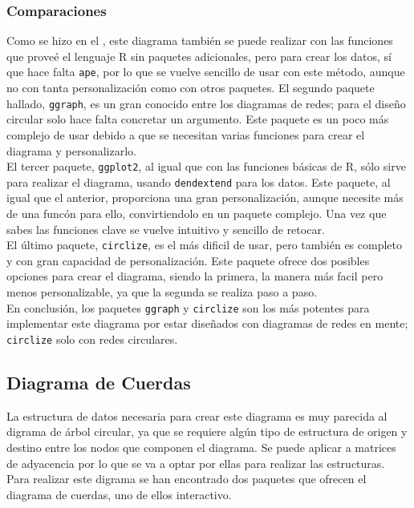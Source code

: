 \documentclass{article}\usepackage[]{graphicx}\usepackage[]{color}
\begin{document}
\subsubsection{Comparaciones}
Como se hizo en el , 
este diagrama tambi\'en se puede realizar con las funciones que prove\'e el lenguaje R sin paquetes adicionales, pero para crear los datos, s\'i que hace falta \texttt{ape}, por lo que se vuelve sencillo de usar con este m\'etodo, aunque no con tanta personalizaci\'on como con otros paquetes. El segundo paquete hallado, \texttt{ggraph}, es un gran conocido entre los diagramas de redes; para el dise\~no circular solo hace falta concretar un argumento. Este paquete es un poco m\'as complejo de usar debido a que se necesitan varias funciones para crear el diagrama y personalizarlo.~\\
El tercer paquete, \texttt{ggplot2}, al igual que con las funciones b\'asicas de R, s\'olo sirve para realizar el diagrama, usando \texttt{dendextend} para los datos. Este paquete, al igual que el anterior, proporciona una gran personalizaci\'on, aunque necesite m\'as de una func\'on para ello, convirtiendolo en un paquete complejo. Una vez que sabes las funciones clave se vuelve intuitivo y sencillo de retocar.~\\
El \'ultimo paquete, \texttt{circlize}, es el m\'as dificil de usar, pero tambi\'en es completo y con gran capacidad de personalizaci\'on. Este paquete ofrece dos posibles opciones para crear el diagrama, siendo la primera, la manera m\'as facil pero menos personalizable, ya que la segunda se realiza paso a paso.~\\
En conclusi\'on, los paquetes \texttt{ggraph} y \texttt{circlize} son los m\'as potentes para implementar este diagrama por estar dise\~nados con diagramas de redes en mente; \texttt{circlize} solo con redes circulares.
\clearpage
\subsection{Diagrama de Cuerdas}\label{ssec:cuerdas}
La estructura de datos necesaria para crear este diagrama es muy parecida al digrama de \'arbol circular, ya que se requiere alg\'un tipo de estructura de origen y destino entre los nodos que componen el diagrama. Se puede aplicar a matrices de adyacencia por lo que se va a optar por ellas para realizar las estructuras.
Para realizar este digrama se han encontrado dos paquetes que ofrecen el diagrama de cuerdas, uno de ellos interactivo.
\end{document}

